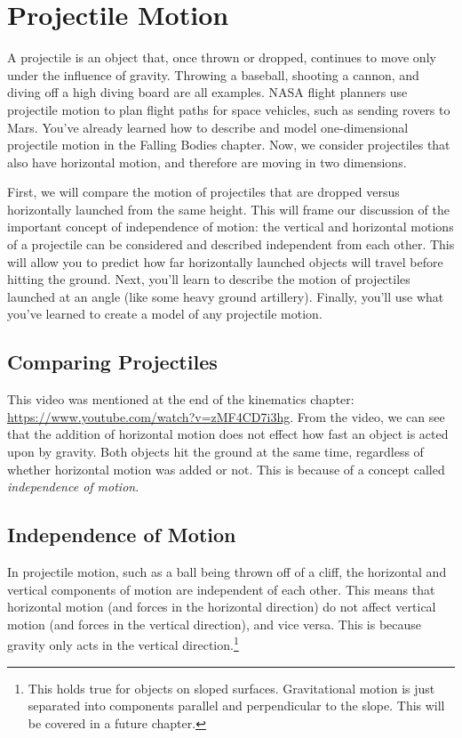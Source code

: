 \chapter{Projectile Motion}
A projectile is an object that, once thrown or dropped, continues to move only 
under the influence of gravity. Throwing a baseball, shooting a cannon, and 
diving off a high diving board are all examples. NASA flight planners use 
projectile motion to plan flight paths for space vehicles, such as sending 
rovers to Mars. You've already learned how to describe and model 
one-dimensional projectile motion in the Falling Bodies chapter. Now, we 
consider projectiles that also have horizontal motion, and therefore are 
moving in two dimensions. 

First, we will compare the motion of projectiles that are dropped versus 
horizontally launched from the same height. This will frame our discussion of 
the important concept of independence of motion: the vertical and horizontal 
motions of a projectile can be considered and described independent from each 
other. This will allow you to predict how far horizontally launched objects 
will travel before hitting the ground. Next, you'll learn to describe the 
motion of projectiles launched at an angle (like some heavy ground artillery). 
Finally, you'll use what you've learned to create a model of any projectile motion. 

\section{Comparing Projectiles}
This video was mentioned at the end of the kinematics chapter: \url{https://www.youtube.com/watch?v=zMF4CD7i3hg}.
From the video, we can see that the addition of horizontal motion does not effect how fast an object is acted upon by gravity. Both objects hit the ground at the same time, regardless of whether horizontal motion was added or not. This is because of a concept called \emph{independence of motion}.


\section{Independence of Motion}
In projectile motion, such as a ball being thrown off of a cliff, the horizontal and vertical components of motion are independent of each other. This means that horizontal motion (and forces in the horizontal direction) do not affect vertical motion (and forces in the vertical direction), and vice versa. This is because gravity only acts in the vertical direction.\footnote{This holds true for objects on sloped surfaces. Gravitational motion is just separated into components parallel and perpendicular to the slope. This will be covered in a future chapter.}

